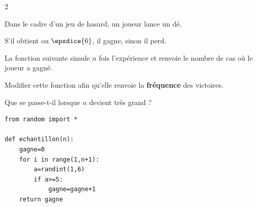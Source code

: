 {\begin{multicols}{2}
	  \begin{exo}{}
		  Dans le cadre d'un jeu de hasard, un joueur lance un dé.

		  S'il obtient  ou $\epsdice{6}$, il gagne, sinon il perd.

		  La fonction suivante simule $n$ fois l'expérience et renvoie le nombre de cas où le joueur a gagné.

		  Modifier cette fonction afin qu'elle renvoie la \textbf{fréquence} des victoires.

		  Que se passe-t-il lorsque $n$ devient très grand ?
		  {\footnotesize
		  \begin{lstlisting}
from random import *

def echantillon(n):
    gagne=0
    for i in range(1,n+1):
        a=randint(1,6)
        if a>=5:
            gagne=gagne+1
    return gagne
\end{lstlisting}
		  }
	  \end{exo}
	  \vfill~

  \end{multicols}
 }
